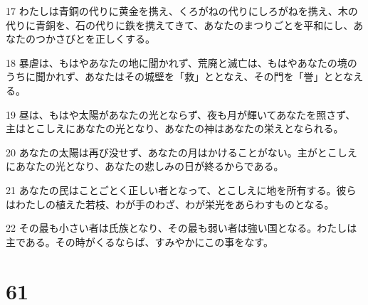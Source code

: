 \par 17 わたしは青銅の代りに黄金を携え、くろがねの代りにしろがねを携え、木の代りに青銅を、石の代りに鉄を携えてきて、あなたのまつりごとを平和にし、あなたのつかさびとを正しくする。
\par 18 暴虐は、もはやあなたの地に聞かれず、荒廃と滅亡は、もはやあなたの境のうちに聞かれず、あなたはその城壁を「救」ととなえ、その門を「誉」ととなえる。
\par 19 昼は、もはや太陽があなたの光とならず、夜も月が輝いてあなたを照さず、主はとこしえにあなたの光となり、あなたの神はあなたの栄えとなられる。
\par 20 あなたの太陽は再び没せず、あなたの月はかけることがない。主がとこしえにあなたの光となり、あなたの悲しみの日が終るからである。
\par 21 あなたの民はことごとく正しい者となって、とこしえに地を所有する。彼らはわたしの植えた若枝、わが手のわざ、わが栄光をあらわすものとなる。
\par 22 その最も小さい者は氏族となり、その最も弱い者は強い国となる。わたしは主である。その時がくるならば、すみやかにこの事をなす。

\chapter{61}


